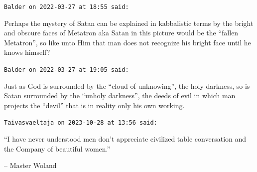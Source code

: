 \begin{footnotesize}
\begin{sffamily}
\hfill

\texttt{Balder on 2022-03-27 at 18:55 said:}

Perhaps the mystery of Satan can be explained in kabbalistic terms by the bright and obscure faces of Metatron aka Satan in this picture would be the ``fallen Metatron'', so like unto Him that man does not recognize his bright face until he knows himself?

\hfill

\texttt{Balder on 2022-03-27 at 19:05 said:}

Just as God is surrounded by the ``cloud of unknowing'', the holy darkness, so is Satan surrounded by the ``unholy darkness'', the deeds of evil in which man projects the ``devil'' that is in reality only his own working.

\hfill

\texttt{Taivasvaeltaja on 2023-10-28 at 13:56 said:}

``I have never understood men don't appreciate civilized table conversation and the Company of beautiful women.''

-- Master Woland

\end{sffamily}
\end{footnotesize}

